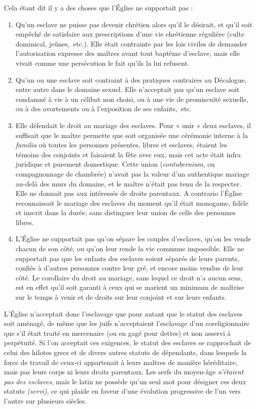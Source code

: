 \temppagebreak


 Cela étant dit il y a des choses que l'Église ne supportait pas :
\begin{enumerate}
\item Qu'un esclave ne puisse pas devenir chrétien alors qu'il le désirait, et qu'il soit empêché de satisfaire aux prescriptions d'une vie chrétienne régulière (culte dominical, jeûnes,~etc.). Elle était contrainte par les lois civiles de demander l'autorisation expresse des maîtres avant tout baptême d'esclave, mais elle vivait comme une persécution le fait qu'ils la lui refusent.
\item Qu'un ou une esclave soit contraint à des pratiques contraires au Décalogue, entre autre dans le domaine sexuel. Elle n'acceptait pas qu'un esclave soit condamné à vie à un célibat non choisi, ou à une vie de promiscuité sexuelle, ou à des avortements ou à l'exposition de ses enfants,~etc.
\item Elle défendait le droit au mariage des esclaves. Pour « unir » deux esclaves, il suffisait que le maître permette que soit organisée une cérémonie interne à la \emph{familia} où toutes les personnes présentes, libres et esclaves, étaient les témoins des conjoints et faisaient la fête avec eux, mais cet acte était infra juridique et purement domestique. Cette union (\emph{contubernium}, ou compagnonnage de chambrée) n'avait pas la valeur d'un authentique mariage au-delà des murs du domaine, et le maître n'était pas tenu de la respecter. Elle ne donnait pas aux intéressés de droits parentaux. A contrario l'Église reconnaissait le mariage des esclaves du moment qu'il était monogame, fidèle et inscrit dans la durée, sans distinguer leur union de celle des personnes libres.
\item L'Église ne supportait pas qu'on sépare les couples d'esclaves, qu'on les vende chacun de son côté, ou qu'on leur rende la vie commune impossible. Elle ne supportait pas que les enfants des esclaves soient séparés de leurs parents, confiés à d'autres personnes contre leur gré, et encore moins vendus de leur côté. Le corollaire du droit au mariage, sans lequel ce droit n'a aucun sens, est en effet qu'il soit garanti à ceux qui se marient un minimum de maîtrise sur le temps à venir et de droits sur leur conjoint et sur leurs enfants. 
\end{enumerate}

 L'Église n'acceptait donc l'esclavage que pour autant que le statut des esclaves soit aménagé, de même que les juifs n'acceptaient l'esclavage d'un coreligionnaire que s'il était traité en mercenaire (ou en gagé pour dettes) et non asservi à perpétuité. Si l'on acceptait ces exigences, le statut des esclaves se rapprochait de celui des hilotes grecs et de divers autres statuts de dépendants, dans lesquels la force de travail de ceux-ci appartenait à leurs maîtres de manière héréditaire, mais pas leurs corps ni leurs droits parentaux. Les serfs du moyen-âge \emph{n'étaient pas des esclaves}, mais le latin ne possède qu'un seul mot pour désigner ces deux statuts \emph{(servi)}, ce qui plaide en faveur d'une évolution progressive de l'un vers l'autre sur plusieurs siècles.

